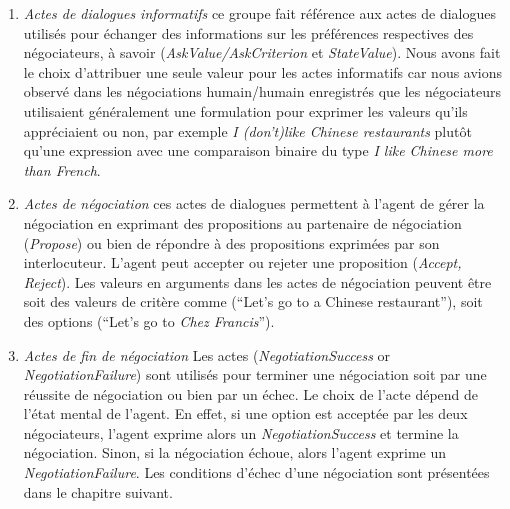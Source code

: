 		\begin{enumerate}
			
			\item \textit{Actes de dialogues informatifs} ce groupe fait référence aux actes de dialogues utilisés pour échanger des informations sur les préférences respectives des négociateurs, à savoir (\textit{AskValue/AskCriterion} et \textit{StateValue}). 
			Nous avons fait le choix d'attribuer une seule valeur pour les actes informatifs car nous avions observé dans les négociations humain/humain enregistrés que les négociateurs utilisaient généralement une formulation pour exprimer les valeurs qu'ils appréciaient ou non, par exemple \textit{I (don't)like Chinese restaurants} plutôt qu'une expression avec une comparaison binaire du type \textit{I like Chinese more than French}.
			
			\item \textit{Actes de négociation} ces actes de dialogues permettent à l'agent de gérer la négociation en exprimant des propositions au partenaire de négociation (\textit{Propose}) ou bien de répondre à des propositions exprimées par son interlocuteur. L'agent peut accepter ou rejeter une proposition (\textit{Accept, Reject}). Les valeurs en arguments dans les actes de négociation peuvent être soit des valeurs de critère comme (``Let's go to a Chinese restaurant''), soit des options  (``Let's go to \emph{Chez Francis}''). 
			
			\item \textit{Actes de fin de négociation} Les actes  (\textit{NegotiationSuccess} or \textit{NegotiationFailure}) sont utilisés pour terminer une négociation soit par une réussite de négociation ou bien par un échec. Le choix de l'acte dépend de l'état mental de l'agent. En effet, si une option est acceptée par les deux négociateurs, l'agent exprime alors un \textit{NegotiationSuccess} et termine la négociation. Sinon, si la négociation échoue, alors l'agent exprime un \textit{NegotiationFailure}. Les conditions d'échec d'une négociation sont présentées dans le chapitre suivant. 
			
		\end{enumerate}
		 
		
		

